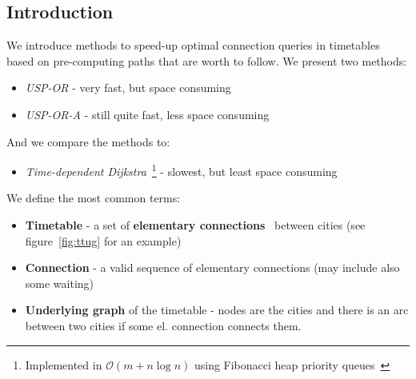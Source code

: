\documentclass[myposter,portrait]{sciposter}
\def\mysection#1{
{\color{sectionCol}\section*{\sc\bfseries #1}}}
\begin{document}
\begin{multicols*}{3}

\mysection{Introduction}

	We introduce methods to speed-up optimal connection queries in timetables based on pre-computing paths that are worth to follow. We present two methods:
	\begin{itemize}
		\item \textit{USP-OR} - very fast, but space consuming
		\item \textit{USP-OR-A} - still quite fast, less space consuming
	\end{itemize}
	And we compare the methods to:
	\begin{itemize}
		\item \textit{Time-dependent Dijkstra}~\footnote{Implemented in $\mathcal{O}(m + n \log n)$ using Fibonacci heap priority queues~\cite{sommerthesis10}} - slowest, but least space consuming
	\end{itemize}
	\hspace{\fill}
	
	We define the most common terms:
	\begin{itemize}
		\item \textbf{Timetable} - a set of \textbf{elementary connections}~\cite{timetablemodelsalgs07} between cities (see figure~\ref{fig:ttug} for an example)
		\item \textbf{Connection} - a valid sequence of elementary connections (may include also some waiting)
		\item \textbf{Underlying graph} of the timetable - nodes are the cities and there is an arc between two cities if some el. connection connects them.
	\end{itemize}


\end{multicols*}
\end{document}
